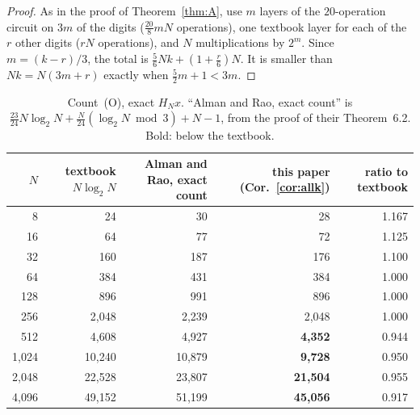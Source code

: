 \documentclass[10pt]{article}
\theoremstyle{remark}
\newcommand{\cntO}{\textup{(O)}}
\renewcommand{\lg}{\log_2}
\begin{document}
\begin{proof}
As in the proof of Theorem~\ref{thm:A}, use $m$ layers of the $20$-operation circuit on $3m$ of the digits
($\tfrac{20}{8}mN$ operations), one textbook layer for each of the $r$ other digits ($rN$ operations), and $N$
multiplications by $2^m$. Since $m=(k-r)/3$, the total is $\tfrac56Nk+(1+\tfrac r6)N$. It is smaller than
$Nk=N(3m+r)$ exactly when $\tfrac52m+1<3m$.
\end{proof}

\begin{table}[ht]
\centering
\small
\begin{tabular}{@{}rrrrr@{}}
\toprule
$N$ & textbook $N\lg N$ & Alman and Rao, exact count & this paper (Cor.~\ref{cor:allk}) & ratio to textbook\\
\midrule
8 & 24 & 30 & 28 & 1.167\\
16 & 64 & 77 & 72 & 1.125\\
32 & 160 & 187 & 176 & 1.100\\
64 & 384 & 431 & 384 & 1.000\\
128 & 896 & 991 & 896 & 1.000\\
256 & 2,048 & 2,239 & 2,048 & 1.000\\
512 & 4,608 & 4,927 & \textbf{4,352} & 0.944\\
1,024 & 10,240 & 10,879 & \textbf{9,728} & 0.950\\
2,048 & 22,528 & 23,807 & \textbf{21,504} & 0.955\\
4,096 & 49,152 & 51,199 & \textbf{45,056} & 0.917\\
\bottomrule
\end{tabular}
\caption{Count~\cntO, exact $H_Nx$. ``Alman and Rao, exact count'' is
$\tfrac{23}{24}N\lg N+\tfrac N{24}(\lg N\bmod 3)+N-1$, from the proof of their Theorem~6.2. Bold: below the
textbook.}
\label{tab:O}
\end{table}
\end{document}
